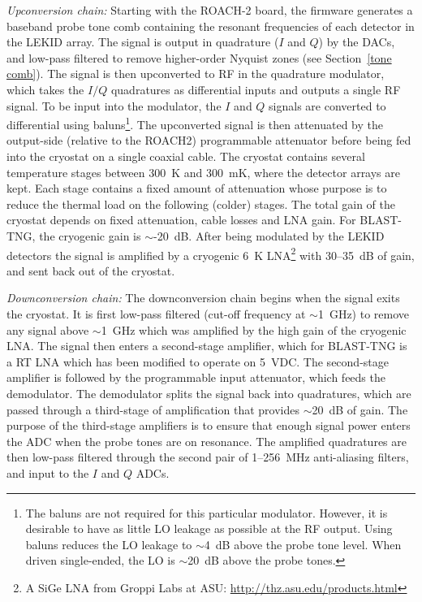 \textit{Upconversion chain:} Starting with the ROACH-2 board, the firmware generates a baseband probe tone comb containing the resonant frequencies of each detector in the LEKID array. The signal is output in quadrature ($I$ and $Q$) by the DACs, and low-pass filtered to remove higher-order Nyquist zones (see Section~\ref{tone comb}). The signal is then upconverted to RF in the quadrature modulator, which takes the $I/Q$ quadratures as differential inputs and outputs a single RF signal. To be input into the modulator, the $I$ and $Q$ signals are converted to differential using baluns\footnote{The baluns are not required for this particular modulator. However, it is desirable to have as little LO leakage as possible at the RF output. Using baluns reduces the LO leakage to $\sim$4~dB above the probe tone level. When driven single-ended, the LO is $\sim$20~dB above the probe tones.}. The upconverted signal is then attenuated by the output-side (relative to the ROACH2) programmable attenuator before being fed into the cryostat on a single coaxial cable. The cryostat contains several temperature stages between 300~K and 300~mK, where the detector arrays are kept. Each stage contains a fixed amount of attenuation whose purpose is to reduce the thermal load on the following (colder) stages. The total gain of the cryostat depends on fixed attenuation, cable losses and LNA gain. For BLAST-TNG, the cryogenic gain is $\sim$-20~dB. After being modulated by the LEKID detectors the signal is amplified by a cryogenic 6~K LNA\footnote{A SiGe LNA from Groppi Labs at ASU: \url{http://thz.asu.edu/products.html}} with 30--35~dB of gain, and sent back out of the cryostat.

\vspace{5mm}

\textit{Downconversion chain:} The downconversion chain begins when the signal exits the cryostat. It is first low-pass filtered (cut-off frequency at $\sim$1~GHz) to remove any signal above $\sim$1~GHz which was amplified by the high gain of the cryogenic LNA. The signal then enters a second-stage amplifier, which for BLAST-TNG is a RT LNA which has been modified to operate on  5~VDC. The second-stage amplifier is followed by the programmable input attenuator, which feeds the demodulator. The demodulator splits the signal back into quadratures, which are passed through a third-stage of amplification that provides $\sim$20~dB of gain. The purpose of the third-stage amplifiers is to ensure that enough signal power enters the ADC when the probe tones are on resonance. The amplified quadratures are then low-pass filtered through the second pair of 1--256~MHz anti-aliasing filters, and input to the $I$ and $Q$ ADCs.

